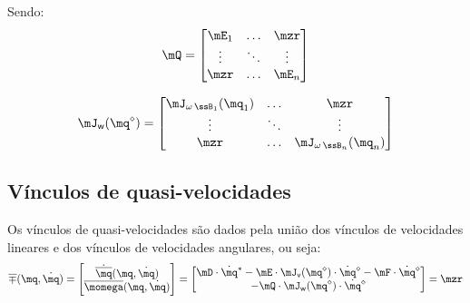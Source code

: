\documentclass[]{politex}
\begin{document}
Sendo:
\begin{equation}
\mQ = \begin{bmatrix}
\mE_1 & \ldots & \mzr\\
\vdots & \ddots & \vdots\\
\mzr &\ldots  & \mE_{n}
\end{bmatrix}
\end{equation}

\begin{equation} \label{eq:VinculosGenericosVelocidadesAngulares}
\mJ_{\mathsf{w}}(\mq^\diamond) =
\begin{bmatrix}
\mJ_{\omega\,\ssB_1}(\mq_1) & \ldots & \mzr\\
\vdots & \ddots & \vdots\\
\mzr &\ldots  & \mJ_{\omega\,\ssB_n}(\mq_n)
\end{bmatrix}
\end{equation}

\subsection{Vínculos de quasi-velocidades} \label{S05-03-02-04}

Os vínculos de quasi-velocidades são dados pela união dos vínculos de velocidades lineares e dos vínculos de velocidades angulares, ou seja:
\begin{equation} \label{eq:VinculosQuasiVel}
\overline{\mp}(\mq,\dot{\mq}) = \begin{bmatrix}
\dot{\overline{\mq}}(\mq,\dot{\mq}) \\
\overline{\momega}(\mq,\dot{\mq})
\end{bmatrix}
= 
\begin{bmatrix}
\mD \cdot \dot{\mq}^\ast  - \mE \cdot \mJ_{\mathsf{v}}(\mq^\diamond) \cdot \dot{\mq}^\diamond  - \mF \cdot \dot{\mq}^\diamond \\
 - \mQ \cdot \mJ_{\mathsf{w}}(\mq^\diamond) \cdot \dot{\mq}^\diamond
\end{bmatrix}
=
\mzr
\end{equation}
\end{document}
